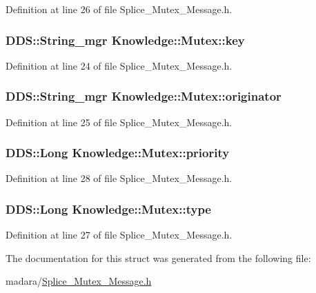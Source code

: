 Definition at line 26 of file Splice\_\-Mutex\_\-Message.h.

\hypertarget{structKnowledge_1_1Mutex_a00c160c9de099889de59c0aaca7f906b}{
\subsubsection[{key}]{\setlength{\rightskip}{0pt plus 5cm}DDS::String\_\-mgr {\bf Knowledge::Mutex::key}}}
\label{db/dd3/structKnowledge_1_1Mutex_a00c160c9de099889de59c0aaca7f906b}


Definition at line 24 of file Splice\_\-Mutex\_\-Message.h.

\hypertarget{structKnowledge_1_1Mutex_a1886b9af38f6c87820496e305f2169c9}{
\subsubsection[{originator}]{\setlength{\rightskip}{0pt plus 5cm}DDS::String\_\-mgr {\bf Knowledge::Mutex::originator}}}
\label{db/dd3/structKnowledge_1_1Mutex_a1886b9af38f6c87820496e305f2169c9}


Definition at line 25 of file Splice\_\-Mutex\_\-Message.h.

\hypertarget{structKnowledge_1_1Mutex_a94783f1624d466c78b0cde9b73e3e6f0}{
\subsubsection[{priority}]{\setlength{\rightskip}{0pt plus 5cm}DDS::Long {\bf Knowledge::Mutex::priority}}}
\label{db/dd3/structKnowledge_1_1Mutex_a94783f1624d466c78b0cde9b73e3e6f0}


Definition at line 28 of file Splice\_\-Mutex\_\-Message.h.

\hypertarget{structKnowledge_1_1Mutex_a7275fa50467479a83ab5e70007cba594}{
\subsubsection[{type}]{\setlength{\rightskip}{0pt plus 5cm}DDS::Long {\bf Knowledge::Mutex::type}}}
\label{db/dd3/structKnowledge_1_1Mutex_a7275fa50467479a83ab5e70007cba594}


Definition at line 27 of file Splice\_\-Mutex\_\-Message.h.



The documentation for this struct was generated from the following file:\begin{DoxyCompactItemize}
\item 
madara/\hyperlink{Splice__Mutex__Message_8h}{Splice\_\-Mutex\_\-Message.h}\end{DoxyCompactItemize}
